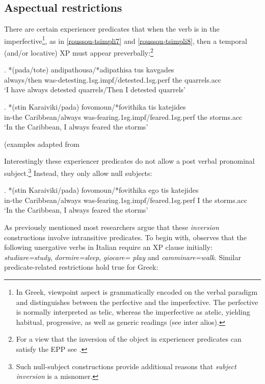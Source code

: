\documentclass[11pt]{article}
\begin{document}
\subsection{Aspectual restrictions}

There are certain experiencer predicates that when the verb is in the imperfective\footnote{In Greek, viewpoint aspect is grammatically encoded on the verbal paradigm and distinguishes between the perfective and the imperfective. The perfective is normally interpreted as telic, whereas the imperfective as atelic, yielding habitual, progressive, as well as generic readings (see \citet{mozer:94,sioupi:02,tsimpli-papadopoulou:05,giannakidou:09} inter alios). }, as in \ref{roussou-tsimpli7} and \ref{roussou-tsimpli8}, then a temporal (and/or locative) XP must appear preverbally:\footnote{For a view that the inversion of the object in experiencer predicates can satisfy the EPP see \citet{landau:10}.}

\exg.
*(pada/tote) andipathousa/*adipathisa tus kavgades\\
always/then was-detesting.1sg.impf/detested.1sg.perf the quarrels.acc\\ \label{roussou-tsimpli7}
`I have always detested quarrels/Then I detested quarrels'

\exg.
*(stin Karaiviki/pada) fovomoun/*fovithika tis katejides\\
in-the Caribbean/always was-fearing.1sg.impf/feared.1sg.perf the storms.acc\\ \label{roussou-tsimpli8}
`In the Caribbean, I always feared the storms'

(examples adapted from \citet[pp. 348]{roussou-tsimpli:06}

Interestingly these experiencer predicates do not allow a post verbal pronominal subject.\footnote{ Such null-subject constructions provide additional reasons that \textit{subject inversion} is a misnomer.} Instead, they only allow null subjects:

\exg.
*(stin Karaiviki/pada) fovomoun/*fovithika ego tis katejides\\
in-the Caribbean/always was-fearing.1sg.impf/feared.1sg.perf  I the storms.acc\\ \label{roussou-tsimpli9}
`In the Caribbean, I always feared the storms'

As previously mentioned most researchers argue that these \textit{inversion} constructions involve intransitive predicates. To begin with, \citet{pinto:97} observes that the following unergative verbs in Italian require an XP clause initially: \textit{studiare=study}, \textit{dormire=sleep}, \textit{giocare= play} and \textit{camminare=walk}. Similar predicate-related restrictions hold true for Greek:
\end{document}
